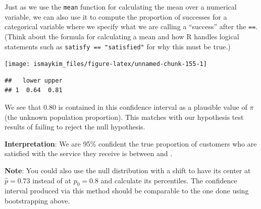 \documentclass[]{tufte-book}
\newenvironment{Shaded}{\begin{snugshade}}{\end{snugshade}}
\newcommand{\KeywordTok}[1]{\textcolor[rgb]{0.13,0.29,0.53}{\textbf{{#1}}}}
\newcommand{\DataTypeTok}[1]{\textcolor[rgb]{0.13,0.29,0.53}{{#1}}}
\newcommand{\DecValTok}[1]{\textcolor[rgb]{0.00,0.00,0.81}{{#1}}}
\newcommand{\FloatTok}[1]{\textcolor[rgb]{0.00,0.00,0.81}{{#1}}}
\newcommand{\StringTok}[1]{\textcolor[rgb]{0.31,0.60,0.02}{{#1}}}
\newcommand{\NormalTok}[1]{{#1}}
\begin{document}
Just as we use the \texttt{mean} function for calculating the mean over
a numerical variable, we can also use it to compute the proportion of
successes for a categorical variable where we specify what we are
calling a ``success'' after the \texttt{==}. (Think about the formula
for calculating a mean and how R handles logical statements such as
\texttt{satisfy\ ==\ "satisfied"} for why this must be true.)

\begin{Shaded}
\end{Shaded}

\begin{center}\texttt{[image: ismaykim\_files/figure-latex/unnamed-chunk-155-1]} \end{center}

\begin{Shaded}
\end{Shaded}

\begin{verbatim}
##   lower upper
## 1  0.64  0.81
\end{verbatim}

We see that 0.80 is contained in this confidence interval as a plausible
value of \(\pi\) (the unknown population proportion). This matches with
our hypothesis test results of failing to reject the null hypothesis.

\textbf{Interpretation}: We are 95\% confident the true proportion of
customers who are satisfied with the service they receive is between and
.

\textbf{Note}: You could also use the null distribution with a shift to
have its center at \(\hat{p} = 0.73\) instead of at \(p_0 = 0.8\) and
calculate its percentiles. The confidence interval produced via this
method should be comparable to the one done using bootstrapping above.
\end{document}
